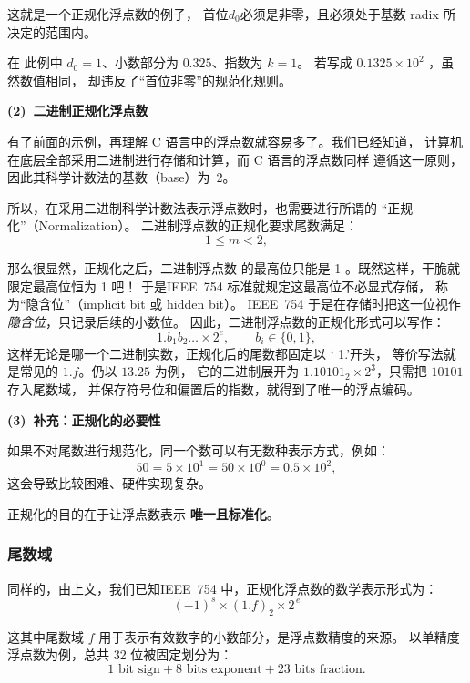 这就是一个正规化浮点数的例子，
首位$d_0$必须是非零，且必须处于基数 radix 所决定的范围内。

在
此例中 $d_0 = 1$、小数部分为 $0.325$、指数为 $k = 1$。
若写成 $0.1325 \times 10^2$ ，虽然数值相同，
却违反了“首位非零”的规范化规则。

\vspace{1em}
\noindent\textbf{(2)~二进制正规化浮点数}\par\vspace{0.5em}

有了前面的示例，再理解 C 语言中的浮点数就容易多了。我们已经知道，
计算机在底层全部采用二进制进行存储和计算，而 C 语言的浮点数同样
遵循这一原则，因此其科学计数法的基数（base）为~2。

所以，在采用二进制科学计数法表示浮点数时，也需要进行所谓的
“正规化”（Normalization）。
二进制浮点数的正规化要求尾数满足：
\[
1 \le m < 2,
\]

那么很显然，正规化之后，二进制浮点数
的最高位只能是 1 。既然这样，干脆就限定最高位恒为 1 吧！
于是IEEE~754 标准就规定这最高位不必显式存储，
称为“隐含位”（implicit bit 或 hidden bit）。
IEEE~754 于是在存储时把这一位视作 \emph{隐含位}，只记录后续的小数位。
\newpage
因此，二进制浮点数的正规化形式可以写作：
\[
1.b_1b_2\ldots \times 2^e,\qquad b_i \in \{0,1\},
\]
这样无论是哪一个二进制实数，正规化后的尾数都固定以 ‘ 1.’开头，
等价写法就是常见的 $1.f$。仍以 $13.25$ 为例，
它的二进制展开为 $1.10101_2 \times 2^3$，只需把 $10101$ 存入尾数域，
并保存符号位和偏置后的指数，就得到了唯一的浮点编码。


\vspace{1em}
\noindent\textbf{(3)~补充：正规化的必要性}\par\vspace{0.5em}

如果不对尾数进行规范化，同一个数可以有无数种表示方式，例如：
\[
50 = 5 \times 10^{1} = 50 \times 10^{0} = 0.5 \times 10^{2},
\]
这会导致比较困难、硬件实现复杂。

正规化的目的在于让浮点数表示 \textbf{唯一且标准化}。


\subsubsection{尾数域}

同样的，由上文，我们已知IEEE~754 中，正规化浮点数的数学表示形式为：
\[
(-1)^s \times (1.f)_2 \times 2^{\,e}
\]


  这其中尾数域 $f$ 用于表示有效数字的小数部分，是浮点数精度的来源。
以单精度浮点数为例，总共 32 位被固定划分为：
\[
1\text{ bit sign} + 8\text{ bits exponent} + 23\text{ bits fraction}.
\]

